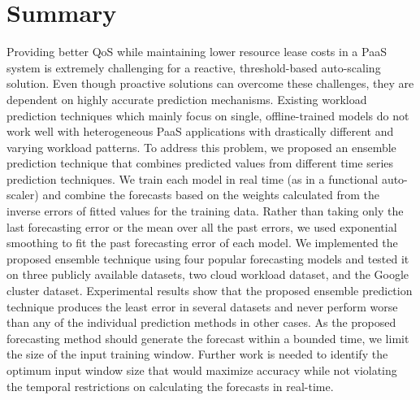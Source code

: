 \section{Summary}

Providing better QoS while maintaining lower resource lease costs in a PaaS system is extremely challenging for a reactive, threshold-based auto-scaling solution. Even though proactive solutions can overcome these challenges, they are dependent on highly accurate prediction mechanisms. Existing workload prediction techniques which mainly focus on single, offline-trained models do not work well with heterogeneous PaaS applications with drastically different and varying workload patterns. To address this problem, we proposed an ensemble prediction technique that combines predicted values from different time series prediction techniques. We train each model in real time (as in a functional auto-scaler) and combine the forecasts based on the weights calculated from the inverse errors of fitted values for the training data. Rather than taking only the last forecasting error or the mean over all the past errors, we used exponential smoothing to fit the past forecasting error of each model. We implemented the proposed ensemble technique using four popular forecasting models and tested it on three publicly available datasets, two cloud workload dataset, and the Google cluster dataset. Experimental results show that the proposed ensemble prediction technique produces the least error in several datasets and never perform worse than any of the individual prediction methods in other cases. As the proposed forecasting method should generate the forecast within a bounded time, we limit the size of the input training window. Further work is needed to identify the optimum input window size that would maximize accuracy while not violating the temporal restrictions on calculating the forecasts in real-time.